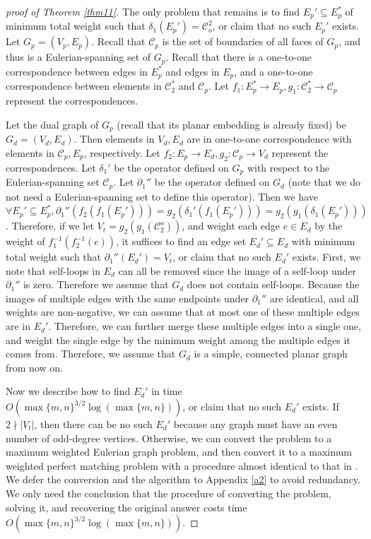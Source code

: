 \documentclass[10pt,fleqn]{article}
\newcommand{\mc}[1]{\mathcal{#1}}
\begin{document}
\begin{proof}[\it{proof of Theorem \ref{thm11}}]
		The only problem that remains is to find $E_p'\subseteq E_p^*$ of minimum total weight such that $\delta_1(E_p')=\mc{C}_o^2$, or claim that no such $E_p'$ exists. Let $G_p=(V_p,E_p)$. Recall that $\mc{C}_p$ is the set of boundaries of all faces of $G_p$, and thus is a Eulerian-spanning set of $G_p$. Recall that there is a one-to-one correspondence between edges in $E_p^*$ and edges in $E_p$, and a one-to-one correspondence between elements in $\mc{C}_2^*$ and $\mc{C}_p$. Let $f_1:E_p^*\to E_p,g_1:\mc{C}_2^*\to\mc{C}_p$ represent the correspondences. \par
		Let the dual graph of $G_p$ (recall that its planar embedding is already fixed) be $G_{d}=(V_d,E_d)$. Then elements in $V_d,E_d$ are in one-to-one correspondence with elements in $\mc{C}_p,E_p$, respectively. Let $f_2:E_p\to E_d,g_2:\mc{C}_p\to V_d$ represent the correspondences. Let $\delta_1'$ be the operator defined on $G_p$ with respect to the Eulerian-spanning set $\mc{C}_p$. Let $\partial_1''$ be the operator defined on $G_d$ (note that we do not need a Eulerian-spanning set to define this operator). Then we have $\forall E_p'\subseteq E_p^*,\partial_1''(f_2(f_1(E_p')))=g_2(\delta_1'(f_1(E_p')))=g_2(g_1(\delta_1(E_p')))$. Therefore, if we let $V_t=g_2(g_1(\mc{C}_2^o))$, and weight each edge $e\in E_d$ by the weight of $f_1^{-1}(f_2^{-1}(e))$, it suffices to find an edge set $E_d'\subseteq E_d$ with minimum total weight such that $\partial_1''(E_d')=V_t$, or claim that no such $E_d'$ exists. First, we note that self-loops in $E_d$ can all be removed since the image of a self-loop under $\partial_1''$ is zero. Therefore we assume that $G_d$ does not contain self-loops. Because the images of multiple edges with the same endpoints under $\partial_1''$ are identical, and all weights are non-negative, we can assume that at most one of these multiple edges are in $E_d'$. Therefore, we can further merge these multiple edges into a single one, and weight the single edge by the minimum weight among the multiple edges it comes from. Therefore, we assume that $G_d$ is a simple, connected planar graph from now on.\par
		Now we describe how to find $E_d'$ in time $O(\max\{m,n\}^{3/2}\log(\max\{m,n\}))$, or claim that no such $E_d'$ exists. If $2\nmid|V_t|$, then there can be no such $E_d'$ because any graph must have an even number of odd-degree vertices. Otherwise, we can convert the problem to a maximum weighted Eulerian graph problem, and then convert it to a maximum weighted perfect matching problem with a procedure almost identical to that in \cite{113}. We defer the conversion and the algorithm to Appendix \ref{a2} to avoid redundancy. We only need the conclusion that the procedure of converting the problem, solving it, and recovering the original answer costs time $O(\max\{m,n\}^{3/2}\log(\max\{m,n\}))$. \par

\end{proof}
\end{document}
